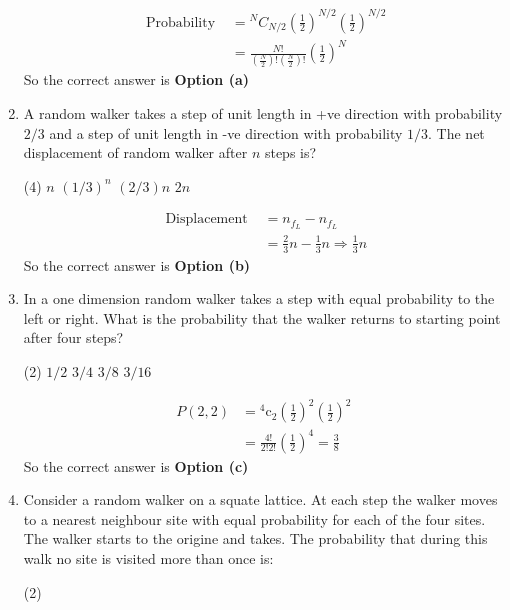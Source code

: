 \begin{enumerate}
\begin{answer}
\begin{align*}
		\text { Probability  }&={ }^{N} C_{N / 2}\left(\frac{1}{2}\right)^{N / 2}\left(\frac{1}{2}\right)^{N / 2}\\
		&=\frac{N !}{\left(\frac{N}{2}\right) !\left(\frac{N}{2}\right) !}\left(\frac{1}{2}\right)^{N}
		\end{align*}
		So the correct answer is \textbf{Option (a)}
	\end{answer}
	\item A random walker takes a step of unit length in +ve direction with probability $2/3$ and a step of unit length in -ve direction with probability $1/3$. The net displacement of random walker after $n$ steps is?
	 \begin{tasks}(4)
		\task[\textbf{a.}]$n$
		\task[\textbf{b.}]$(1 / 3)^{n}$
		\task[\textbf{c.}]$(2 / 3) n$
		\task[\textbf{d.}]$2 n$
	\end{tasks}
	\begin{answer}
		\begin{align*}
		\text { Displacement } &=n_{f_{L}}-n_{f_{L}} \\
		&=\frac{2}{3} n-\frac{1}{3} n \Rightarrow \frac{1}{3} n
		\end{align*}
		So the correct answer is \textbf{Option (b)}
	\end{answer}
	\item In a one dimension random walker takes a step with equal probability to the left or right. What is the probability that the walker returns to starting point after four steps?
	 \begin{tasks}(2)
		\task[\textbf{a.}]$1 / 2$
		\task[\textbf{b.}]$3 / 4$
		\task[\textbf{c.}]$3 / 8$
		\task[\textbf{d.}] $3 / 16$ 
	\end{tasks}
	\begin{answer}
		\begin{align*}
		P(2,2) &={ }^{4} \mathrm{c}_{2}\left(\frac{1}{2}\right)^{2}\left(\frac{1}{2}\right)^{2} \\
		&=\frac{4 !}{2 ! 2 !}\left(\frac{1}{2}\right)^{4}=\frac{3}{8}
		\end{align*}
		So the correct answer is \textbf{Option (c)}
	\end{answer}
	\item Consider a random walker on a squate lattice. At each step the walker moves to a nearest neighbour site with equal probability for each of the four sites.  The walker starts to the origine and takes. The probability that during this walk no site is visited more than once is:
	 \begin{tasks}(2)

\end{tasks}
\end{enumerate}
